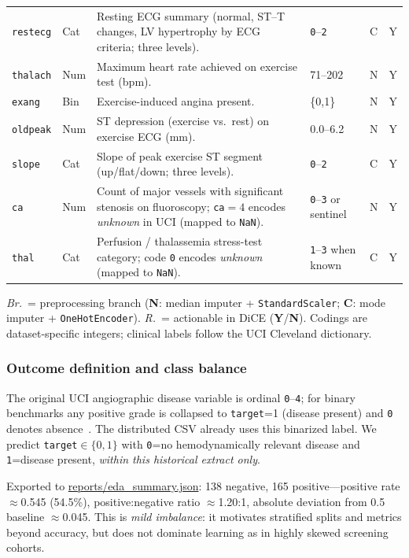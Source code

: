 \documentclass[11pt,a4paper]{article}
\begin{document}
{\begin{longtable}{@{}p{1.05cm}p{1.05cm}p{4.05cm}p{2.35cm}p{0.95cm}p{0.85cm}@{}}
  \texttt{restecg} & Cat & Resting ECG summary (normal, ST--T changes, LV hypertrophy by ECG criteria; three levels). & \texttt{0}--\texttt{2} & C & Y \\
  \texttt{thalach} & Num & Maximum heart rate achieved on exercise test (bpm). & \num{71}--\num{202} & N & Y \\
  \texttt{exang} & Bin & Exercise-induced angina present. & \{0,1\} & N & Y \\
  \texttt{oldpeak} & Num & ST depression (exercise vs.\ rest) on exercise ECG (mm). & \num{0.0}--\num{6.2} & N & Y \\
  \texttt{slope} & Cat & Slope of peak exercise ST segment (up/flat/down; three levels). & \texttt{0}--\texttt{2} & C & Y \\
  \texttt{ca} & Num & Count of major vessels with significant stenosis on fluoroscopy; \texttt{ca}${}=4$ encodes \emph{unknown} in UCI (mapped to \texttt{NaN}). & \texttt{0}--\texttt{3} or sentinel & N & Y \\
  \texttt{thal} & Cat & Perfusion / thalasse\-mia stress-test category; code \texttt{0} encodes \emph{unknown} (mapped to \texttt{NaN}). & \texttt{1}--\texttt{3} when known & C & Y \\
\end{longtable}
}
\noindent\textit{Br.}\ = preprocessing branch (\textbf{N}: median imputer + \texttt{StandardScaler}; \textbf{C}: mode imputer + \texttt{OneHotEncoder}). \textit{R.}\ = actionable in DiCE (\textbf{Y}/\textbf{N}). Codings are dataset-specific integers; clinical labels follow the UCI Cleveland dictionary.

\subsubsection{Outcome definition and class balance}

The original UCI angiographic disease variable is ordinal \texttt{0}--\texttt{4}; for binary benchmarks any positive grade is collapsed to \texttt{target}=1 (disease present) and \texttt{0} denotes absence~\cite{uci,detrano}. The distributed CSV already uses this binarized label. We predict \texttt{target}$\in\{0,1\}$ with \texttt{0}=no hemodynamically relevant disease and \texttt{1}=disease present, \emph{within this historical extract only}.

Exported to \url{reports/eda_summary.json}: \num{138} negative, \num{165} positive—positive rate $\approx$\num{0.545} (54.5\%), positive:negative ratio $\approx$\num{1.20}:1, absolute deviation from \num{0.5} baseline $\approx$\num{0.045}. This is \emph{mild imbalance}: it motivates stratified splits and metrics beyond accuracy, but does not dominate learning as in highly skewed screening cohorts.
\end{document}
